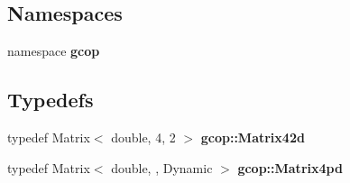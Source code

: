 \subsection*{\-Namespaces}
\begin{DoxyCompactItemize}
\item 
namespace {\bf gcop}
\end{DoxyCompactItemize}
\subsection*{\-Typedefs}
\begin{DoxyCompactItemize}
\item 
typedef \-Matrix$<$ double, 4, 2 $>$ {\bf gcop\-::\-Matrix42d}
\item 
typedef \-Matrix$<$ double, , \-Dynamic $>$ {\bf gcop\-::\-Matrix4pd}
\end{DoxyCompactItemize}
